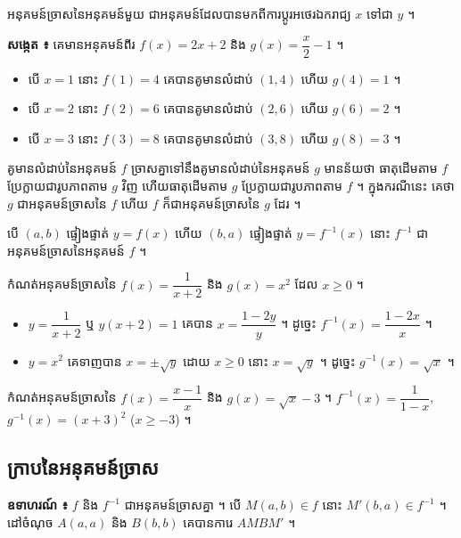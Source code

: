 \begin{definition}[និយមន័យ]
អនុគមន៍ច្រាសនៃអនុគមន៍មួយ ជាអនុគមន៍ដែលបានមកពីការប្ដូរអថេរឯករាជ្យ $x$ ទៅជា $y$ ។
\end{definition}

\textbf{សង្កេត ៖} គេមានអនុគមន៍ពីរ $f(x) = 2x + 2$ និង $g(x) = \dfrac{x}{2} - 1$ ។
\begin{itemize}
  \item បើ $x = 1$ នោះ $f(1) = 4$ គេបានគូមានលំដាប់ $(1, 4)$ ហើយ $g(4) = 1$ ។
  \item បើ $x = 2$ នោះ $f(2) = 6$ គេបានគូមានលំដាប់ $(2, 6)$ ហើយ $g(6) = 2$ ។
  \item បើ $x = 3$ នោះ $f(3) = 8$ គេបានគូមានលំដាប់ $(3, 8)$ ហើយ $g(8) = 3$ ។
\end{itemize}
គូមានលំដាប់នៃអនុគមន៍ $f$ ច្រាសគ្នាទៅនឹងគូមានលំដាប់នៃអនុគមន៍ $g$ មានន័យថា ធាតុដើមតាម $f$ ប្រែក្លាយជារូបភាពតាម $g$ វិញ ហើយធាតុដើមតាម $g$ ប្រែក្លាយជារូបភាពតាម $f$ ។ ក្នុងករណីនេះ គេថា $g$ ជាអនុគមន៍ច្រាសនៃ $f$ ហើយ $f$ ក៏ជាអនុគមន៍ច្រាសនៃ $g$ ដែរ ។

\begin{formulaBox}[ជាទូទៅ]
បើ $(a, b)$ ផ្ទៀងផ្ទាត់ $y = f(x)$ ហើយ $(b, a)$ ផ្ទៀងផ្ទាត់ $y = f^{-1}(x)$ នោះ $f^{-1}$ ជាអនុគមន៍ច្រាសនៃអនុគមន៍ $f$ ។
\end{formulaBox}

\begin{example}[លំហាត់គំរូ]
កំណត់អនុគមន៍ច្រាសនៃ $f(x) = \dfrac{1}{x + 2}$ និង $g(x) = x^2$ ដែល $x \ge 0$ ។
\ans
\begin{itemize}
  \item $y = \dfrac{1}{x + 2}$ ឬ $y(x + 2) = 1$ គេបាន $x = \dfrac{1 - 2y}{y}$ ។ ដូច្នេះ $f^{-1}(x) = \dfrac{1 - 2x}{x}$ ។
  \item $y = x^2$ គេទាញបាន $x = \pm\sqrt{y}$ ដោយ $x \ge 0$ នោះ $x = \sqrt{y}$ ។ ដូច្នេះ $g^{-1}(x) = \sqrt{x}$ ។
\end{itemize}
\end{example}

\begin{pro}
កំណត់អនុគមន៍ច្រាសនៃ $f(x) = \dfrac{x - 1}{x}$ និង $g(x) = \sqrt{x} - 3$ ។
\ans
$f^{-1}(x) = \dfrac{1}{1 - x}$, \quad $g^{-1}(x) = (x + 3)^2$ ($x \ge -3$) ។
\end{pro}

\subsection{ក្រាបនៃអនុគមន៍ច្រាស}

\textbf{ឧទាហរណ៍ ៖} $f$ និង $f^{-1}$ ជាអនុគមន៍ច្រាសគ្នា ។ បើ $M(a, b) \in f$ នោះ $M'(b, a) \in f^{-1}$ ។ ដៅចំណុច $A(a, a)$ និង $B(b, b)$ គេបានការេ $AMBM'$ ។

